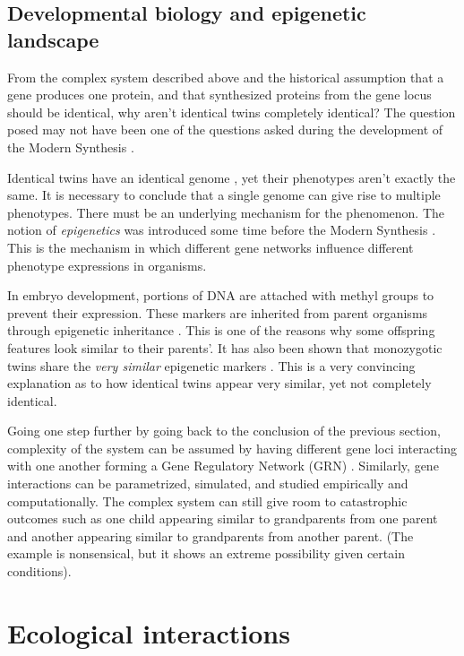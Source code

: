 \subsection{Developmental biology and epigenetic landscape}
From the complex system described above and the historical assumption that a gene produces one protein, and that synthesized proteins from the gene locus should be identical, why aren't identical twins completely identical?
The question posed may not have been one of the questions asked during the development of the Modern Synthesis \cite{Baedke2013, Goldberg2007}.

Identical twins have an identical genome \cite{twinz}, yet their phenotypes aren't exactly the same.
It is necessary to conclude that a single genome can give rise to multiple phenotypes.
There must be an underlying mechanism for the phenomenon.
The notion of \emph{epigenetics} was introduced some time before the Modern Synthesis \cite{Baedke2013}.
This is the mechanism in which different gene networks influence different phenotype expressions in organisms.

In embryo development, portions of DNA are attached with methyl groups to prevent their expression.
These markers are inherited from parent organisms through epigenetic inheritance \cite{Goldberg2007}.
This is one of the reasons why some offspring features look similar to their parents'.
It has also been shown that monozygotic twins share the \emph{very similar} epigenetic markers \cite{superepi}.
This is a very convincing explanation as to how identical twins appear very similar, yet not completely identical.

Going one step further by going back to the conclusion of the previous section, complexity of the system can be assumed by having different gene loci interacting with one another forming a Gene Regulatory Network (GRN) \cite{Goldberg2007}.
Similarly, gene interactions can be parametrized, simulated, and studied empirically and computationally.
The complex system can still give room to catastrophic outcomes such as one child appearing similar to grandparents from one parent and another appearing similar to grandparents from another parent.
(The example is nonsensical, but it shows an extreme possibility given certain conditions).

\section{Ecological interactions}
